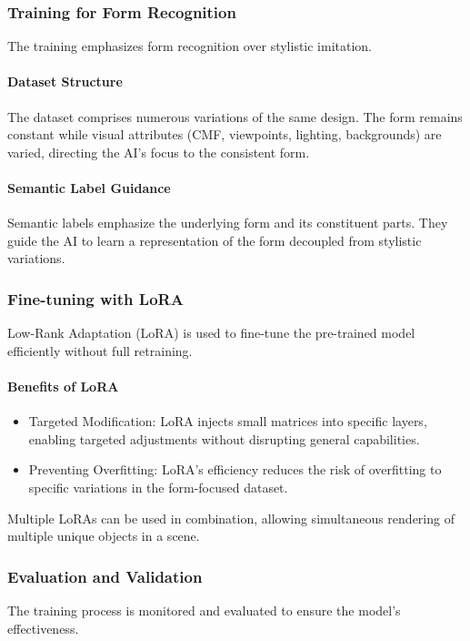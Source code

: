 \documentclass[12pt]{article}
\begin{document}
\subsubsection{Training for Form Recognition}

The training emphasizes form recognition over stylistic imitation.

\paragraph{Dataset Structure}
The dataset comprises numerous variations of the same design. The form remains constant while visual attributes (CMF, viewpoints, lighting, backgrounds) are varied, directing the AI's focus to the consistent form.

\paragraph{Semantic Label Guidance}
Semantic labels emphasize the underlying form and its constituent parts. They guide the AI to learn a representation of the form decoupled from stylistic variations.


\subsubsection{Fine-tuning with LoRA}
Low-Rank Adaptation (LoRA) is used to fine-tune the pre-trained model efficiently without full retraining.

\paragraph{Benefits of LoRA}
\begin{itemize}
    \item Targeted Modification: LoRA injects small matrices into specific layers, enabling targeted adjustments without disrupting general capabilities.
    \item Preventing Overfitting: LoRA's efficiency reduces the risk of overfitting to specific variations in the form-focused dataset.
\end{itemize}

Multiple LoRAs can be used in combination, allowing simultaneous rendering of multiple unique objects in a scene.

\subsubsection{Evaluation and Validation}
The training process is monitored and evaluated to ensure the model's effectiveness.
\end{document}
